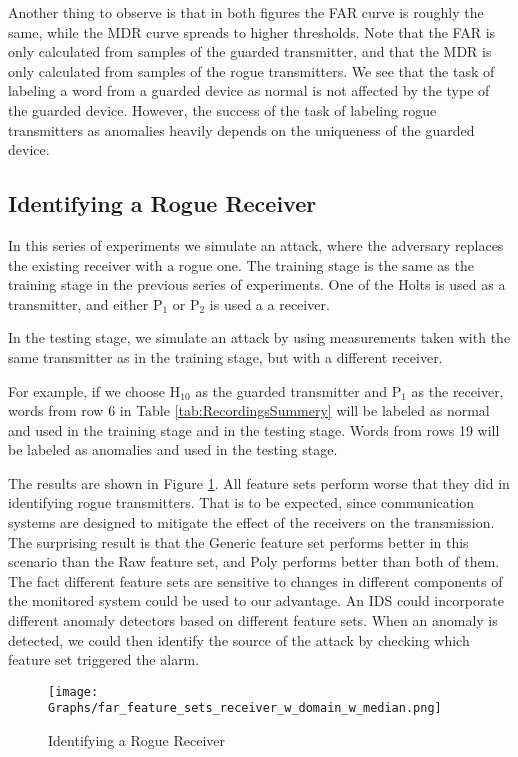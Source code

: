 \documentclass[conference]{IEEEtran}
\begin{document}
  Another thing to observe is that in both figures the FAR curve is roughly the same, while the MDR curve spreads to higher thresholds. Note that the FAR is only calculated from samples of the guarded transmitter, and that the MDR is only calculated from samples of the rogue transmitters. We see that the task of labeling a word from a guarded device as normal is not affected by the type of the guarded device. However, the success of the task of labeling rogue transmitters as anomalies heavily depends on the uniqueness of the guarded device.
   
\subsection{Identifying a Rogue Receiver}
  In this series of experiments we simulate an attack, where the adversary replaces the existing receiver with a rogue one. The training stage is the same as the training stage in the previous series of experiments. One of the Holts is used as a transmitter, and either \(\text{P}_1\) or \(\text{P}_2\) is used a a receiver.
  
  In the testing stage, we simulate an attack by using measurements taken with the same transmitter as in the training stage, but with a different receiver.
  
  For example, if we choose \(\text{H}_{10}\) as the guarded transmitter and \(\text{P}_1\) as the receiver, words from row 6 in Table \ref{tab:RecordingsSummery} will be labeled as normal and used in the training stage and in the testing stage. Words from rows 19 will be labeled as anomalies and used in the testing stage.
  
  The results are shown in Figure \ref{fig:receiver_results}. All feature sets perform worse that they did in identifying rogue transmitters. That is to be expected, since communication systems are designed to mitigate the effect of the receivers on the transmission. The surprising result is that the Generic feature set performs better in this scenario than the Raw feature set, and Poly performs better than both of them. The fact different feature sets are sensitive to changes in different components of the monitored system could be used to our advantage. An IDS could incorporate different anomaly detectors based on different feature sets. When an anomaly is detected, we could then identify the source of the attack by checking which feature set triggered the alarm.
  
  \begin{figure}[t]
    \centering
    \texttt{[image: Graphs/far\_feature\_sets\_receiver\_w\_domain\_w\_median.png]}
    \caption{Identifying a Rogue Receiver}
    \label{fig:receiver_results}
  \end{figure}
  
\end{document}
